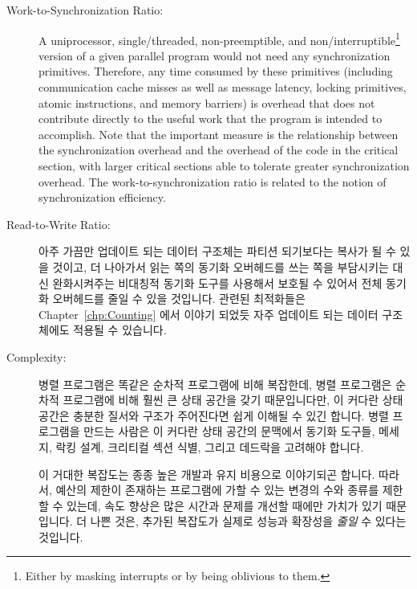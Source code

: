 \begin{description}
\item[Work-to-Synchronization Ratio:]  A uniprocessor,
	single\-/threaded, non-preemptible, and non\-/interruptible\footnote{
		Either by masking interrupts or by being oblivious to them.}
	version of a given parallel
	program would not need any synchronization primitives.
	Therefore, any time consumed by these primitives
	(including communication cache misses as well as
	message latency, locking primitives, atomic instructions,
	and memory barriers)
	is overhead that does not contribute directly to the useful
	work that the program is intended to accomplish.
	Note that the important measure is the
	relationship between the synchronization overhead
	and the overhead of the code in the critical section, with larger
	critical sections able to tolerate greater synchronization overhead.
	The work-to-synchronization ratio is related to
	the notion of synchronization efficiency.  %
\fi
\item[Read-to-Write Ratio:]  아주 가끔만 업데이트 되는 데이터 구조체는 파티션
	되기보다는 복사가 될 수 있을 것이고, 더 나아가서 읽는 쪽의 동기화
	오버헤드를 쓰는 쪽을 부담시키는 대신 완화시켜주는 비대칭적 동기화
	도구를 사용해서 보호될 수 있어서 전체 동기화 오버헤드를 줄일 수 있을
	것입니다.
	관련된 최적화들은 Chapter~\ref{chp:Counting} 에서 이야기 되었듯 자주
	업데이트 되는 데이터 구조체에도 적용될 수 있습니다.
\iffalse

\item[Read-to-Write Ratio:]  A data structure that is
	rarely updated may often be replicated rather than partitioned,
	and furthermore may be protected with asymmetric
	synchronization primitives that reduce readers' synchronization
	overhead at the expense of that of writers, thereby
	reducing overall synchronization overhead.
	Corresponding optimizations are possible for frequently
	updated data structures, as discussed in
	Chapter~\ref{chp:Counting}.
\fi
\item[Complexity:]  병렬 프로그램은 똑같은 순차적 프로그램에 비해 복잡한데,
	병렬 프로그램은 순차적 프로그램에 비해 훨씬 큰 상태 공간을 갖기
	때문입니다만, 이 커다란 상태 공간은 충분한 질서와 구조가 주어진다면
	쉽게 이해될 수 있긴 합니다.
	병렬 프로그램을 만드는 사람은 이 커다란 상태 공간의 문맥에서 동기화
	도구들, 메세지, 락킹 설계, 크리티컬 섹션 식별, 그리고 데드락을 고려해야
	합니다.

	이 거대한 복잡도는 종종 높은 개발과 유지 비용으로 이야기되곤 합니다.
	따라서, 예산의 제한이 존재하는 프로그램에 가할 수 있는 변경의 수와
	종류를 제한할 수 있는데, 속도 향상은 많은 시간과 문제를 개선할 때에만
	가치가 있기 때문입니다.
	더 나쁜 것은, 추가된 복잡도가 실제로 성능과 확장성을 \emph{줄일} 수
	있다는 것입니다.


\end{description}

